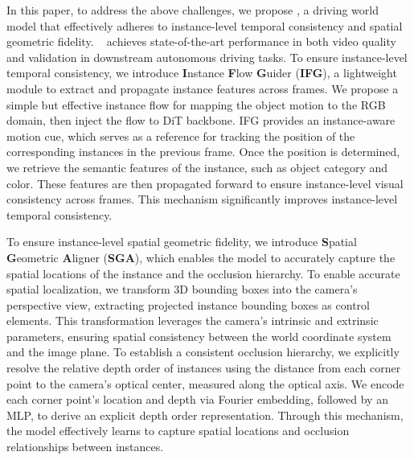 In this paper, to address the above challenges, we propose \titleDef, a driving world model that effectively adheres to instance-level temporal consistency and spatial geometric fidelity. \titleDef~ achieves state-of-the-art performance in both video quality and validation in downstream autonomous driving tasks.
To ensure instance-level temporal consistency, we introduce \textbf{I}nstance \textbf{F}low \textbf{G}uider (\textbf{IFG}), a lightweight module to extract and propagate instance features across frames. We propose a simple but effective instance flow for mapping the object motion to the RGB domain, then inject the flow to DiT backbone. IFG provides an instance-aware motion cue, which serves as a reference for tracking the position of the corresponding instances in the previous frame. Once the position is determined, we retrieve the semantic features of the instance, such as object category and color. These features are then propagated forward to ensure instance-level visual consistency across frames. This mechanism significantly improves instance-level temporal consistency.

To ensure instance-level spatial geometric fidelity, we introduce \textbf{S}patial \textbf{G}eometric \textbf{A}ligner (\textbf{SGA}), which enables the model to accurately capture the spatial locations of the instance and the occlusion hierarchy. 
To enable accurate spatial localization, we transform 3D bounding boxes into the camera's perspective view, extracting projected instance bounding boxes as control elements. This transformation leverages the camera's intrinsic and extrinsic parameters, ensuring spatial consistency between the world coordinate system and the image plane.
To establish a consistent occlusion hierarchy, we explicitly resolve the relative depth order of instances using the distance from each corner point to the camera's optical center, measured along the optical axis. We encode each corner point's location and depth via Fourier embedding, followed by an MLP, to derive an explicit depth order representation.
Through this mechanism, the model effectively learns to capture spatial locations and occlusion relationships between instances.


